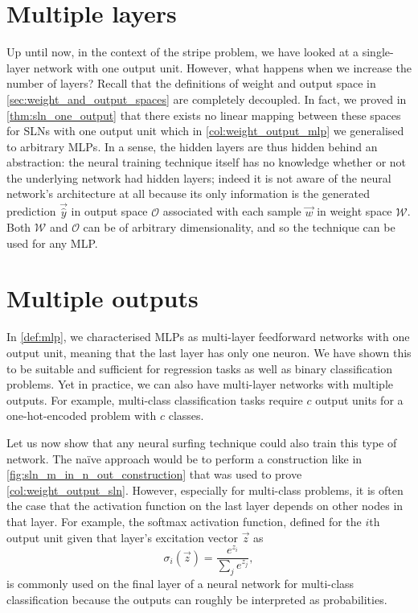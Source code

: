 \section{Multiple layers}
Up until now, in the context of the stripe problem, we have looked at a single-layer network with one output unit.
However, what happens when we increase the number of layers?
Recall that the definitions of weight and output space in \ref{sec:weight_and_output_spaces} are completely decoupled. 
In fact, we proved in \ref{thm:sln_one_output} that there exists no linear mapping between these spaces for SLNs with one output unit which in \ref{col:weight_output_mlp} we generalised to arbitrary MLPs. 
In a sense, the hidden layers are thus hidden behind an abstraction: the neural training technique itself has no knowledge whether or not the underlying network had hidden layers; indeed it is not aware of the neural network's architecture at all because its only information is the generated prediction $\vec{\hat{y}}$ in output space $\mathcal{O}$ associated with each sample $\vec{w}$ in weight space $\mathcal{W}$.
Both  $\mathcal{W}$ and $\mathcal{O}$ can be of arbitrary dimensionality, and so the technique can be used for any MLP.


\section{Multiple outputs}
In \ref{def:mlp}, we characterised MLPs as multi-layer feedforward networks with one output unit, meaning that the last layer has only one neuron. 
We have shown this to be suitable and sufficient for regression tasks as well as binary classification problems. 
Yet in practice, we can also have multi-layer networks with multiple outputs.
For example, multi-class classification tasks require $c$ output units for a one-hot-encoded problem with $c$ classes.

Let us now show that any neural surfing technique could also train this type of network.
The na\"{i}ve approach would be to perform a construction like in \ref{fig:sln_m_in_n_out_construction} that was used to prove \ref{col:weight_output_sln}.
However, especially for multi-class problems, it is often the case that the activation function on the last layer depends on other nodes in that layer.
For example, the softmax activation function, defined for the $i$th output unit given that layer's excitation vector $\vec{z}$ as
\begin{equation}
    \sigma_i(\vec{z}) = \frac{e^{z_i}}{\sum_j{e^{z_j}}},
\end{equation}
is commonly used on the final layer of a neural network for multi-class classification because the outputs can roughly be interpreted as probabilities. 

